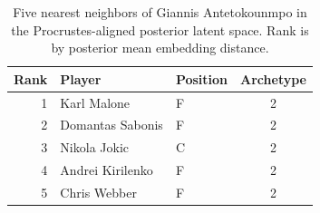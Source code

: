 \begin{table}[htbp]
  \centering\small
  \begin{tabular}{rllc}
    \toprule
    Rank & Player & Position & Archetype \\
    \midrule
    1 & Karl Malone & F & 2 \\
    2 & Domantas Sabonis & F & 2 \\
    3 & Nikola Jokic & C & 2 \\
    4 & Andrei Kirilenko & F & 2 \\
    5 & Chris Webber & F & 2 \\
    \bottomrule
  \end{tabular}
  \caption{Five nearest neighbors of Giannis Antetokounmpo in the Procrustes-aligned posterior latent space. Rank is by posterior mean embedding distance.}
\end{table}

